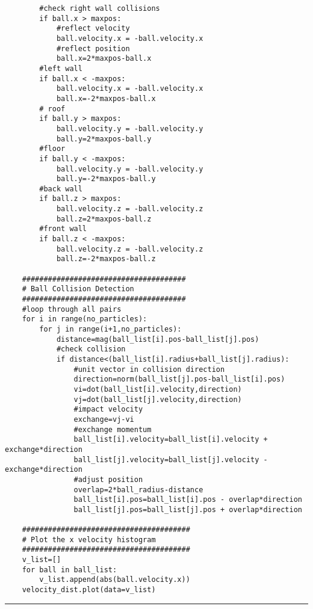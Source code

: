 \documentclass[a4]{article}
\begin{document}
{\begin{verbatim}
        #check right wall collisions
        if ball.x > maxpos:
            #reflect velocity
            ball.velocity.x = -ball.velocity.x
            #reflect position
            ball.x=2*maxpos-ball.x
        #left wall
        if ball.x < -maxpos:
            ball.velocity.x = -ball.velocity.x
            ball.x=-2*maxpos-ball.x
        # roof
        if ball.y > maxpos:
            ball.velocity.y = -ball.velocity.y
            ball.y=2*maxpos-ball.y
        #floor
        if ball.y < -maxpos:
            ball.velocity.y = -ball.velocity.y
            ball.y=-2*maxpos-ball.y
        #back wall
        if ball.z > maxpos:
            ball.velocity.z = -ball.velocity.z
            ball.z=2*maxpos-ball.z
        #front wall
        if ball.z < -maxpos:
            ball.velocity.z = -ball.velocity.z
            ball.z=-2*maxpos-ball.z

    ######################################
    # Ball Collision Detection
    ######################################
    #loop through all pairs
    for i in range(no_particles):
        for j in range(i+1,no_particles):
            distance=mag(ball_list[i].pos-ball_list[j].pos)
            #check collision
            if distance<(ball_list[i].radius+ball_list[j].radius):
                #unit vector in collision direction
                direction=norm(ball_list[j].pos-ball_list[i].pos)
                vi=dot(ball_list[i].velocity,direction)
                vj=dot(ball_list[j].velocity,direction)
                #impact velocity
                exchange=vj-vi
                #exchange momentum
                ball_list[i].velocity=ball_list[i].velocity + exchange*direction
                ball_list[j].velocity=ball_list[j].velocity - exchange*direction
                #adjust position
                overlap=2*ball_radius-distance
                ball_list[i].pos=ball_list[i].pos - overlap*direction
                ball_list[j].pos=ball_list[j].pos + overlap*direction

    #######################################
    # Plot the x velocity histogram
    #######################################
    v_list=[]
    for ball in ball_list:
        v_list.append(abs(ball.velocity.x))
    velocity_dist.plot(data=v_list)
\end{verbatim}\hrule}

\end{document}
